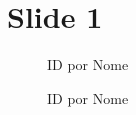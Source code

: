\documentclass[a4paper,landscape]{article}
\begin{document}
\section*{Slide 1}


\begin{figure}[H]
\centering
\caption{ID por Nome}
\end{figure}


\begin{figure}[H]
\centering
\caption{ID por Nome}
\end{figure}




\newpage


\end{document}
